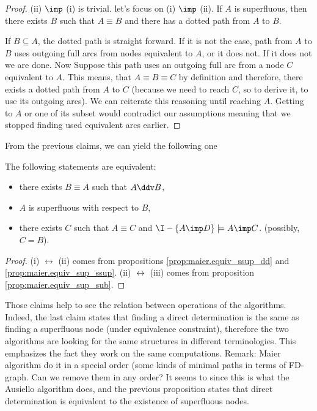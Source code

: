 \begin{proof} (ii) $\imp$ (i) is trivial. let's focus on (i) $\imp$ (ii). If 
	$A$ is superfluous, then there exists $B$ such that $A \equiv B$ and there 
	has a dotted path from $A$ to $B$.
	
	\vspace{1.2em}
	
	If $B \subseteq A$, the dotted path is straight forward. If it is not the 
	case, path from $A$ to $B$ uses outgoing full arcs from nodes equivalent to 
	$A$, or it does not. If it does not we are done. Now Suppose this
	path uses an outgoing full arc from a node $C$ equivalent to $A$. This 
	means, that $A \equiv B \equiv C$ by definition and therefore, there exists 
	a
	dotted path from $A$ to $C$ (because we need to reach $C$, so to derive it,
	to use its outgoing arcs). We can reiterate this reasoning until reaching 
	$A$. Getting to $A$ or one of its subset would contradict our assumptions 
	meaning that we stopped finding used equivalent arcs earlier.
	
\end{proof}

From the previous claims, we can yield the following one

\begin{proposition} \label{prop:maier.equiv_sup_dd_sub}
	The following statements are equivalent:
	\begin{itemize}
		\item[(i)] there exists $B \equiv A$ such that $A \ddv B$,
		\item[(ii)] $A$ is superfluous with respect to $B$,
		\item[(iii)] there exists $C$ such that $A \equiv C$ and $\I - \{A \imp 
		D \} \models A \imp C$. (possibly, $C = B$).
	\end{itemize}
\end{proposition}

\begin{proof} (i) $\longleftrightarrow$ (ii) comes from propositions 
	\ref{prop:maier.equiv_ssup_dd} and \ref{prop:maier.equiv_sup_ssup}. (ii) 
	$\longleftrightarrow$ (iii) comes from proposition 
	\ref{prop:maier.equiv_sup_sub}.
	
\end{proof}

Those claims help to see the relation between operations of the algorithms. 
Indeed, the last claim states that finding a direct determination is the same
as finding a superfluous node (under equivalence constraint), therefore the two 
algorithms are looking for
the same structures in different terminologies. This emphasizes the fact they
work on the same computations. Remark: Maier algorithm do it in a special 
order (some kinds of minimal paths in terms of FD-graph. Can we remove them in 
any order? It seems to since this is what the Ausiello algorithm does, and
the previous proposition states that direct determination is equivalent to the
existence of superfluous nodes.

